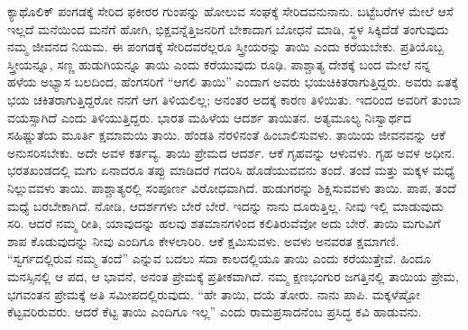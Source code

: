ಕ್ಯಾಥೊಲಿಕ್​ ಪಂಗಡಕ್ಕೆ ಸೇರಿದ ಫಕೀರರ ಗುಂಪನ್ನು ಹೋಲುವ ಸಂಘಕ್ಕೆ ಸೇರಿದವನು\break ನಾನು. ಬಟ್ಟೆಬರೆಗಳ ಮೇಲೆ ಆಸೆ ಇಲ್ಲದೆ ಮನೆಯಿಂದ ಮನೆಗೆ ಹೋಗಿ, ಭಿಕ್ಷವನ್ನೆತ್ತಿ\break ಜನರಿಗೆ ಬೇಕಾದಾಗ ಬೋಧನೆ ಮಾಡಿ, ಸ್ಥಳ ಸಿಕ್ಕಿದೆಡೆ ತಂಗುವುದು ನಮ್ಮ ಜೀವನದ ನಿಯಮ. ಈ ಪಂಗಡಕ್ಕೆ ಸೇರಿದವರೆಲ್ಲರೂ ಸ್ತ್ರೀಯರನ್ನು ತಾಯಿ ಎಂದು ಕರೆಯಬೇಕು. ಪ್ರತಿಯೊಬ್ಬ ಸ್ತ್ರೀಯನ್ನೂ, ಸಣ್ಣ ಹುಡುಗಿಯನ್ನೂ ತಾಯಿ ಎಂದು ಕರೆಯುವುದು ರೂಢಿ. ಪಾಶ್ಚಾತ್ಯ ದೇಶಕ್ಕೆ ಬಂದ ಮೇಲೆ ನನ್ನ ಹಳೆಯ ಅಭ್ಯಾಸ ಬಲದಿಂದ, ಹೆಂಗಸರಿಗೆ “ಆಗಲಿ ತಾಯಿ” ಎಂದಾಗ ಅವರು ಭಯಚಿಕಿತರಾಗುತ್ತಿದ್ದರು. ಅವರು ಏತಕ್ಕೆ ಭಯ ಚಕಿತರಾಗುತ್ತಿದ್ದರೋ ನನಗೆ ಆಗ ತಿಳಿಯಲಿಲ್ಲ; ಅನಂತರ ಅದಕ್ಕೆ ಕಾರಣ ತಿಳಿಯಿತು. ಇದರಿಂದ ಅವರಿಗೆ ತುಂಬಾ ವಯಸ್ಸಾಗಿದೆ ಎಂದು ತಿಳಿಯುತ್ತಿದ್ದರು. ಭಾರತ ಮಹಿಳೆಯ ಆದರ್ಶ ತಾಯಿತನ. ಅತ್ಯಮೂಲ್ಯ ನಿಃಸ್ವಾರ್ಥದ ಸಹಿಷ್ಣುತೆಯ ಮೂರ್ತಿ ಕ್ಷಮಾಮಯಿ ತಾಯಿ. ಹೆಂಡತಿ ನೆರಳಿನಂತೆ ಹಿಂಬಾಲಿಸುವಳು. ತಾಯಿಯ ಜೀವನವನ್ನು ಆಕೆ ಅನುಸರಿಸಬೇಕು. ಅದೇ ಅವಳ ಕರ್ತವ್ಯ. ತಾಯಿ ಪ್ರೇಮದ ಆದರ್ಶ. ಆಕೆ ಗೃಹವನ್ನು ಆಳುವಳು. ಗೃಹ ಅವಳ ಅಧೀನ. ಭರತಖಂಡದಲ್ಲಿ ಮಗು ಏನಾದರೂ ತಪ್ಪು ಮಾಡಿದರೆ ಗದರಿಸಿ ಹೊಡೆಯುವವನು ತಂದೆ. ತಂದೆ ಮತ್ತು ಮಕ್ಕಳ ಮಧ್ಯೆ ನಿಲ್ಲುವವಳು ತಾಯಿ. ಪಾಶ್ಚಾತ್ಯರಲ್ಲಿ ಸಂಪೂರ್ಣ ವಿರೋಧವಾಗಿದೆ. ಹುಡುಗರನ್ನು ಶಿಕ್ಷಿಸುವವಳು ತಾಯಿ. ಪಾಪ, ತಂದೆ ಮಧ್ಯೆ ಬರಬೇಕಾಗಿದೆ. ನೋಡಿ, ಆದರ್ಶಗಳು ಬೇರೆ ಬೇರೆ. ಇದನ್ನು ನಾನು ದೂರುತ್ತಿಲ್ಲ. ನೀವು ಇಲ್ಲಿ ಮಾಡುವುದು ಸರಿ. ಆದರೆ ನಮ್ಮ ರೀತಿ, ಯಾವುದನ್ನು ಹಲವು ಶತಮಾನಗಳಿಂದ ಕಲಿತಿರುವೆವೋ ಅದು ಬೇರೆ. ತಾಯಿ ಮಗುವಿಗೆ ಶಾಪ ಕೊಡುವುದನ್ನು ನೀವು ಎಂದಿಗೂ ಕೇಳಲಾರಿರಿ. ಆಕೆ ಕ್ಷಮಿಸುವಳು. ಅವಳು ಅನವರತ ಕ್ಷಮಾಗಣಿ. “ಸ್ವರ್ಗದಲ್ಲಿರುವ ನಮ್ಮ ತಂದೆ” ಎನ್ನುವ ಬದಲು ಸದಾ ಕಾಲದಲ್ಲಿಯೂ ತಾಯಿ ಎಂದು ಕರೆಯುತ್ತೇವೆ. ಹಿಂದೂ ಮನಸ್ಸಿನಲ್ಲಿ ಆ ಪದ, ಆ ಭಾವನೆ, ಅನಂತ ಪ್ರೇಮಕ್ಕೆ ಪ್ರತೀಕವಾಗಿದೆ. ನಮ್ಮ ಕ್ಷಣಭಂಗುರ ಜಗತ್ತಿನಲ್ಲಿ ತಾಯಿಯ ಪ್ರೇಮ, ಭಗವಂತನ ಪ್ರೇಮಕ್ಕೆ ಅತಿ ಸಮೀಪದಲ್ಲಿರುವುದು. “ಹೇ ತಾಯಿ, ದಯೆ ತೋರು. ನಾನು ಪಾಪಿ. ಮಕ್ಕಳೆಷ್ಟೋ ಕೆಟ್ಟವರಿರುವರು. ಆದರೆ ಕೆಟ್ಟ ತಾಯಿ ಎಂದಿಗೂ ಇಲ್ಲ” ಎಂದು ರಾಮಪ್ರಸಾದನೆಂಬ ಪ್ರಸಿದ್ಧ ಕವಿ ಹಾಡುವನು.

